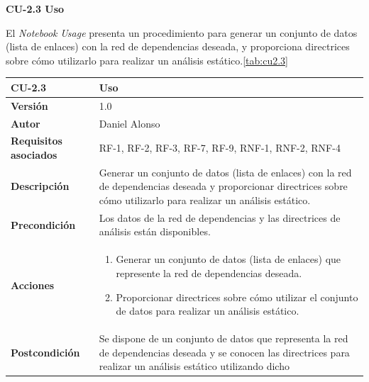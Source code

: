 \textbf{CU-2.3 Uso}

El \textit{Notebook} \textit{Usage} presenta un procedimiento para generar un conjunto de datos
(lista de enlaces) con la red de dependencias deseada, y proporciona directrices sobre cómo
utilizarlo para realizar un análisis estático.\ref{tab:cu2.3}

\begin{table}[h!]
	\centering
	\begin{tabularx}{\linewidth}{ p{} p{} }
		\toprule
		\textbf{CU-2.3}               & \textbf{Uso}                                                                                               \\
		\toprule
		\textbf{Versión}              & 1.0                                                                                                        \\
		\textbf{Autor}                & Daniel Alonso                                                                                              \\
		\textbf{Requisitos asociados} & RF-1, RF-2, RF-3, RF-7, RF-9, RNF-1, RNF-2, RNF-4                                                                                    \\
		\textbf{Descripción}          & Generar un conjunto de datos (lista de enlaces) con la red de dependencias
		deseada y proporcionar directrices sobre cómo utilizarlo para realizar un análisis estático.                                               \\
		\textbf{Precondición}         & Los datos de la red de dependencias y las directrices de análisis están
		disponibles.                                                                                                                               \\
		\textbf{Acciones}             & \begin{enumerate}
			                                \item Generar un conjunto de datos (lista de enlaces) que represente la red de dependencias deseada.
			                                \item Proporcionar directrices sobre cómo utilizar el conjunto de datos para realizar un análisis estático.
		                                \end{enumerate} \\
		\textbf{Postcondición}        & Se dispone de un conjunto de datos que representa la red de dependencias
		deseada y se conocen las directrices para realizar un análisis estático utilizando dicho

\end{tabularx}
\end{table}
